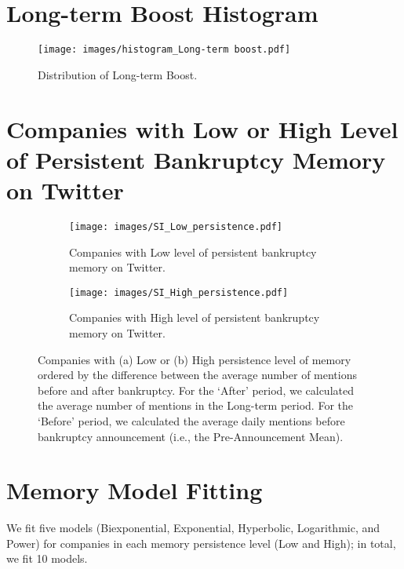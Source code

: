 \documentclass[9pt,twoside,lineno]{pnas-new}
\begin{document}
\section*{Long-term Boost Histogram}
\begin{figure}[H]
\center
    \texttt{[image: images/histogram\_Long-term boost.pdf]}
    \caption{  Distribution of Long-term Boost.}
    \label{SI_fig:Long_term}
\end{figure}


\section*{Companies with Low or High Level of Persistent Bankruptcy Memory on Twitter}
\begin{figure*}[h]
  \centering
  \begin{subfigure}[b]{0.45\textwidth}
     \texttt{[image: images/SI\_Low\_persistence.pdf]}
    \caption{Companies with Low level of persistent bankruptcy memory on Twitter.}
    \label{fig:sub1}
  \end{subfigure}
  \hfill
  \begin{subfigure}[b]{0.45\textwidth}
    \texttt{[image: images/SI\_High\_persistence.pdf]}
    \caption{Companies with High level of persistent bankruptcy memory on Twitter.}
    \label{fig:sub2}
  \end{subfigure}
  \caption{
           Companies with (a) Low or (b) High persistence level of memory ordered by the difference between the average number of mentions before and after bankruptcy.
           For the `After' period, we calculated the average number of mentions in the Long-term period.
           For the `Before' period, we calculated the average daily mentions before bankruptcy announcement (i.e., the Pre-Announcement Mean).
  }
  \label{SI_fig:high_low}
\end{figure*}


\section*{Memory Model Fitting}
\label{sec:SI_model_fit}
We fit five models (Biexponential, Exponential, Hyperbolic, Logarithmic, and Power) for companies in each memory persistence level (Low and High); in total, we fit 10 models.
\end{document}
